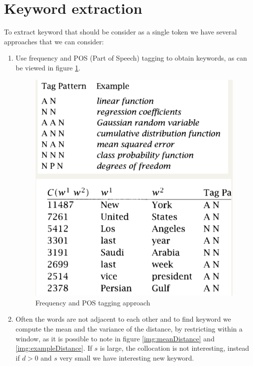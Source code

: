 \section{Keyword extraction}
To extract keyword that should be consider as a single token we have several approaches that we can consider:
\begin{enumerate}
    \item Use frequency and POS (Part of Speech) tagging to obtain keywords, 
	  as can be viewed in figure \ref{img:posFrequency}.

	  \begin{figure}
		  \includegraphics[width=\textwidth]{Images/posFrequency}
		  \caption{Frequency and POS tagging approach}
		  \label{img:posFrequency}
	  \end{figure}

    \item Often the words are not adjacent to each other and to find keyword we 
	  compute the mean and the variance of the distance, 
	  by restricting within a window, as it is possible to note in figure
	  \ref{img:meanDistance} and \ref{img:exampleDistance}.
	  If $s$ is large, the collocation is not interesting, instead if
	  $d > 0$ and $s$ very small we have interesting new keyword.


\end{enumerate}
